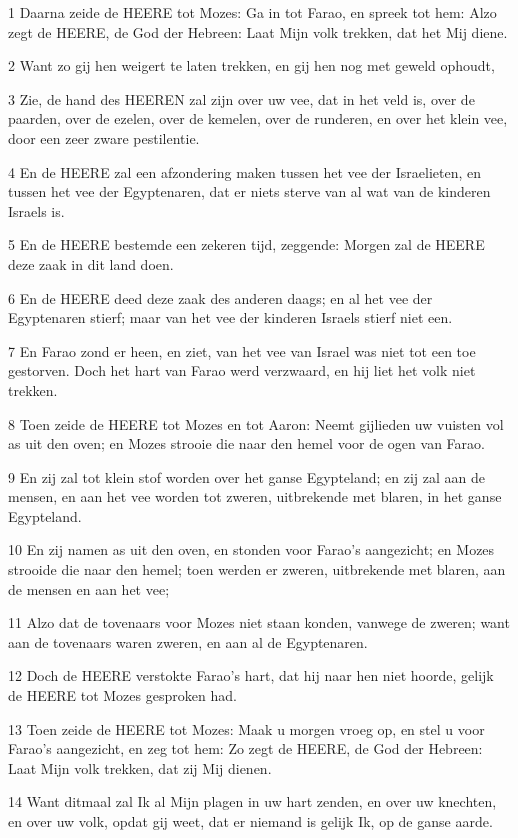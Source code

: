 \par 1 Daarna zeide de HEERE tot Mozes: Ga in tot Farao, en spreek tot hem: Alzo zegt de HEERE, de God der Hebreen: Laat Mijn volk trekken, dat het Mij diene.
\par 2 Want zo gij hen weigert te laten trekken, en gij hen nog met geweld ophoudt,
\par 3 Zie, de hand des HEEREN zal zijn over uw vee, dat in het veld is, over de paarden, over de ezelen, over de kemelen, over de runderen, en over het klein vee, door een zeer zware pestilentie.
\par 4 En de HEERE zal een afzondering maken tussen het vee der Israelieten, en tussen het vee der Egyptenaren, dat er niets sterve van al wat van de kinderen Israels is.
\par 5 En de HEERE bestemde een zekeren tijd, zeggende: Morgen zal de HEERE deze zaak in dit land doen.
\par 6 En de HEERE deed deze zaak des anderen daags; en al het vee der Egyptenaren stierf; maar van het vee der kinderen Israels stierf niet een.
\par 7 En Farao zond er heen, en ziet, van het vee van Israel was niet tot een toe gestorven. Doch het hart van Farao werd verzwaard, en hij liet het volk niet trekken.
\par 8 Toen zeide de HEERE tot Mozes en tot Aaron: Neemt gijlieden uw vuisten vol as uit den oven; en Mozes strooie die naar den hemel voor de ogen van Farao.
\par 9 En zij zal tot klein stof worden over het ganse Egypteland; en zij zal aan de mensen, en aan het vee worden tot zweren, uitbrekende met blaren, in het ganse Egypteland.
\par 10 En zij namen as uit den oven, en stonden voor Farao's aangezicht; en Mozes strooide die naar den hemel; toen werden er zweren, uitbrekende met blaren, aan de mensen en aan het vee;
\par 11 Alzo dat de tovenaars voor Mozes niet staan konden, vanwege de zweren; want aan de tovenaars waren zweren, en aan al de Egyptenaren.
\par 12 Doch de HEERE verstokte Farao's hart, dat hij naar hen niet hoorde, gelijk de HEERE tot Mozes gesproken had.
\par 13 Toen zeide de HEERE tot Mozes: Maak u morgen vroeg op, en stel u voor Farao's aangezicht, en zeg tot hem: Zo zegt de HEERE, de God der Hebreen: Laat Mijn volk trekken, dat zij Mij dienen.
\par 14 Want ditmaal zal Ik al Mijn plagen in uw hart zenden, en over uw knechten, en over uw volk, opdat gij weet, dat er niemand is gelijk Ik, op de ganse aarde.
